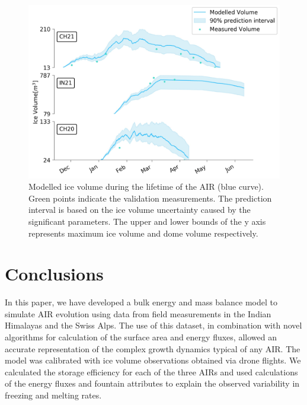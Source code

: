 \documentclass[utf8]{frontiersSCNS} %
\begin{document}

\begin{figure}
	\begin{center}
		\includegraphics[width=\linewidth]{Figures/icev_results.jpg}
	\end{center}
	\caption{Modelled ice volume during the lifetime of the AIR (blue curve). Green points indicate the validation
		measurements. The prediction interval is based on the ice volume uncertainty caused by the significant parameters.  The
		upper and lower bounds of the y axis represents maximum ice volume and dome volume respectively.  }
	\label{fig:results} \end{figure}

\section{Conclusions}
In this paper, we have developed a bulk energy and mass balance model to simulate AIR evolution using data from field measurements in the Indian
Himalayas and the Swiss Alps. The use of this dataset, in combination with novel algorithms for calculation of the surface
area and energy fluxes, allowed an accurate representation of the complex growth dynamics typical of any AIR. The model
was calibrated with ice volume observations obtained via drone flights. We calculated the storage
efficiency for each of the three AIRs and used calculations of the energy fluxes and fountain attributes to explain the
observed variability in freezing and melting rates.
\end{document}
